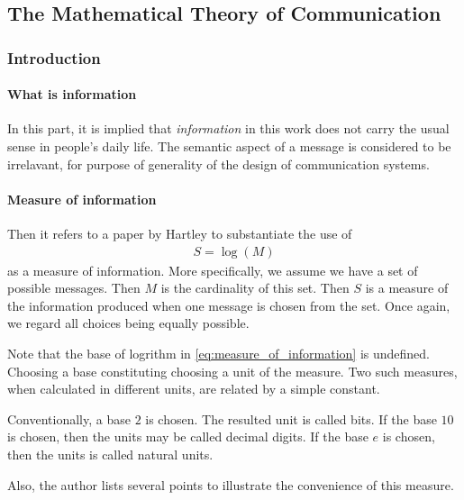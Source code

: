 \documentclass{article}
\numberwithin{equation}{subsection} %
\theoremstyle{definition}
\begin{document}
    \subsection{The Mathematical Theory of Communication}
    \label{sec:The_Mathematical_Theory_of_Communication}
    \subsubsection{Introduction}

    \paragraph{What is information}
    In this part, it is implied that \textit{information} in this work
    does not carry the usual sense in people's daily life. The semantic
    aspect of a message is considered to be irrelavant, for purpose
    of generality of the design of communication systems.

    \paragraph{Measure of information} 

    Then it refers to a paper by Hartley to substantiate the use of
    \begin{align}
        \label{eq:measure_of_information}
        S = \log(M)
    \end{align}
    as a measure of information. More specifically, we assume we have a
    set of possible messages. Then $M$ is the cardinality of this set.
    Then $S$ is a measure of the information produced when one message
    is chosen from the set. Once again, we regard all choices 
    being equally possible.

    Note that the base of logrithm in \ref{eq:measure_of_information}
    is undefined. Choosing a base constituting choosing a unit of
    the measure. Two such measures, when calculated in different units,
    are related by a simple constant.

    Conventionally, a base $2$ is chosen. The resulted unit is called
    bits. If the base $10$ is chosen, then the units may be called
    decimal digits. If the base $e$ is chosen, then the units is
    called natural units.

    Also, the author lists several points to illustrate the
    convenience of this measure.
\end{document}
